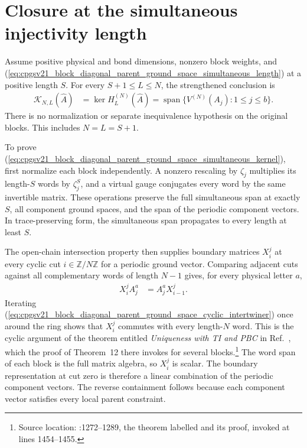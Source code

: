 \documentclass{article}
\begin{document}
\section{Closure at the simultaneous injectivity length}

Assume positive physical and bond dimensions, nonzero block weights, and
(\ref{eq:cpgsv21_block_diagonal_parent_ground_space_simultaneous_length}) at a positive length $S$.
For every $S+1\leq L\leq N$, the strengthened conclusion is
\begin{align}
  \mathcal K_{N,L}(\widehat A)
  &=\ker H_L^{(N)}(\widehat A)
    =\operatorname{span}\{V^{(N)}(A_j):1\leq j\leq b\}.
  \label{eq:cpgsv21_block_diagonal_parent_ground_space_simultaneous_kernel}
\end{align}
There is no normalization or separate inequivalence hypothesis on the
original blocks. This includes $N=L=S+1$.

To prove (\ref{eq:cpgsv21_block_diagonal_parent_ground_space_simultaneous_kernel}), first normalize each
block independently. A nonzero rescaling by $\zeta_j$ multiplies its
length-$S$ words by $\zeta_j^S$, and a virtual gauge conjugates every
word by the same invertible matrix. These operations preserve the full
simultaneous span at exactly $S$, all component ground spaces, and the
span of the periodic component vectors. In trace-preserving form, the
simultaneous span propagates to every length at least $S$.

The open-chain intersection property then supplies boundary matrices
$X_i^j$ at every cyclic cut $i\in\mathbb Z/N\mathbb Z$ for a periodic
ground vector. Comparing adjacent cuts against all complementary words
of length $N-1$ gives, for every physical letter $a$,
\begin{align}
  X_i^j A_j^a&=A_j^a X_{i-1}^j.
  \label{eq:cpgsv21_block_diagonal_parent_ground_space_cyclic_intertwiner}
\end{align}
Iterating (\ref{eq:cpgsv21_block_diagonal_parent_ground_space_cyclic_intertwiner}) once around the ring
shows that $X_i^j$ commutes with every length-$N$ word. This is the
cyclic argument of the theorem entitled \emph{Uniqueness with TI and PBC} in
Ref.~\cite{PerezGarcia2007MPSReps}, which the proof of Theorem~12 there
invokes for several blocks.\footnote{Source location:
:1272--1289, the theorem
labelled  and its proof, invoked at lines 1454--1455.}
The word span of each block is the full matrix algebra, so $X_i^j$ is
scalar. The boundary
representation at cut zero is therefore a linear combination of the
periodic component vectors. The reverse containment follows because
each component vector satisfies every local parent constraint.
\end{document}

